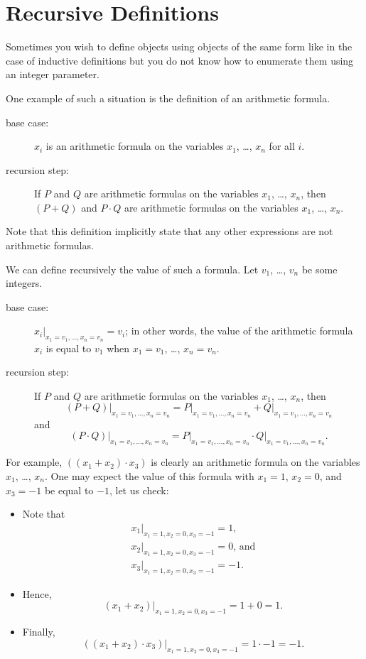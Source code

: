 \section{Recursive Definitions}
Sometimes you wish to define objects using objects of the same form like in the
case of inductive definitions but you do not know how to enumerate them using
an integer parameter.

One example of such a situation is the definition of an arithmetic formula.
\begin{description}
  \item[base case:] $x_i$ is an arithmetic formula on the variables $x_1$,
    \dots, $x_n$ for all $i$.
  \item[recursion step:] If $P$ and $Q$ are arithmetic formulas on the variables
    $x_1$, \dots, $x_n$, then $(P + Q)$ and $P \cdot Q$ are arithmetic formulas
    on the variables $x_1$, \dots, $x_n$.
\end{description}
Note that this definition implicitly state that any other expressions are not
arithmetic formulas.

We can define recursively the value of such a formula. Let $v_1$, \dots, $v_n$
be some integers.
\begin{description}
  \item[base case:] $x_i\big\rvert_{x_1 = v_1, \dots, x_n = v_n} = v_i$; in other words,
    the value of the arithmetic formula $x_i$ is equal to $v_1$ when $x_1 =
    v_1$, \dots, $x_n = v_n$.
  \item[recursion step:] If $P$ and $Q$ are arithmetic formulas on the
    variables $x_1$, \dots, $x_n$, then
    \[
      (P + Q)\big\rvert_{x_1 = v_1, \dots, x_n = v_n} =
      P\big\rvert_{x_1 = v_1, \dots, x_n = v_n} + Q\big\rvert_{x_1 = v_1, \dots, x_n = v_n}
    \]
    and
    \[
      (P \cdot Q)\big\rvert_{x_1 = v_1, \dots, x_n = v_n} =
      P\big\rvert_{x_1 = v_1, \dots, x_n = v_n} \cdot Q\big\rvert_{x_1 = v_1, \dots, x_n = v_n}.
    \]
\end{description}

For example, $((x_1 + x_2) \cdot x_3)$ is clearly an arithmetic formula on the
variables $x_1$, \dots, $x_n$. One may expect the value of this formula with $x_1 = 1$, $x_2 = 0$, and $x_3 = -1$ be equal to $-1$, let us check:
\begin{itemize}
  \item Note that
    \[
      \begin{array}{l}
        x_1\big\rvert_{x_1 = 1, x_2 = 0, x_3 = -1} = 1, \\
        x_2\big\rvert_{x_1 = 1, x_2 = 0, x_3 = -1} = 0\text{, and} \\
        x_3\big\rvert_{x_1 = 1, x_2 = 0, x_3 = -1} = -1.
      \end{array}
    \]
  \item Hence,
    \[
      (x_1 + x_2)\big\rvert_{x_1 = 1, x_2 = 0, x_3 = -1} = 1 + 0 = 1.
    \]
  \item Finally,
    \[
      ((x_1 + x_2) \cdot x_3)\big\rvert_{x_1 = 1, x_2 = 0, x_3 = -1} = 1 \cdot -
      1 = -1.
    \]
\end{itemize}

